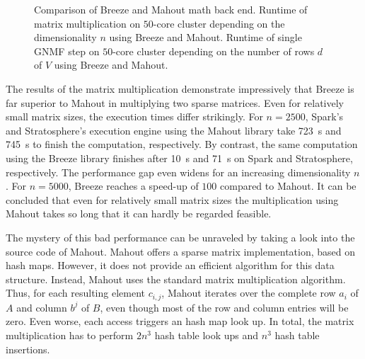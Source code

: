 \begin{figure}
\begin{subfigure}{\dualpgfwidth}
		\caption{}
		\label{subfig:nmfMathBackend}
	\end{subfigure}
	\caption{Comparison of Breeze and Mahout math back end.  Runtime of matrix multiplication on $50$-core cluster depending on the dimensionality $n$ using Breeze and Mahout.  Runtime of single GNMF step on $50$-core cluster depending on the number of rows $d$ of $V$ using Breeze and Mahout.}
	\label{fig:nnmfLoadMathBackend}
\end{figure}

The results of the matrix multiplication demonstrate impressively that Breeze is far superior to Mahout in multiplying two sparse matrices.
Even for relatively small matrix sizes, the execution times differ strikingly.
For $n=2500$, Spark's and Stratosphere's execution engine using the Mahout library take \SI{723}{\second} and \SI{745}{\second} to finish the computation, respectively.
By contrast, the same computation using the Breeze library finishes after \SI{10}{\second} and \SI{71}{\second} on Spark and Stratosphere, respectively.
The performance gap even widens for an increasing dimensionality $n$.
For $n=5000$, Breeze reaches a speed-up of $100$ compared to Mahout.
It can be concluded that even for relatively small matrix sizes the multiplication using Mahout takes so long that it can hardly be regarded feasible.

The mystery of this bad performance can be unraveled by taking a look into the source code of Mahout.
Mahout offers a sparse matrix implementation, based on hash maps.
However, it does not provide an efficient algorithm for this data structure.
Instead, Mahout uses the standard matrix multiplication algorithm.
Thus, for each resulting element $c_{i,j}$, Mahout iterates over the complete row $a_i$ of $A$ and column $b^{j}$ of $B$, even though most of the row and column entries will be zero.
Even worse, each access triggers an hash map look up.
In total, the matrix multiplication has to perform $2n^3$ hash table look ups and $n^3$ hash table insertions.

